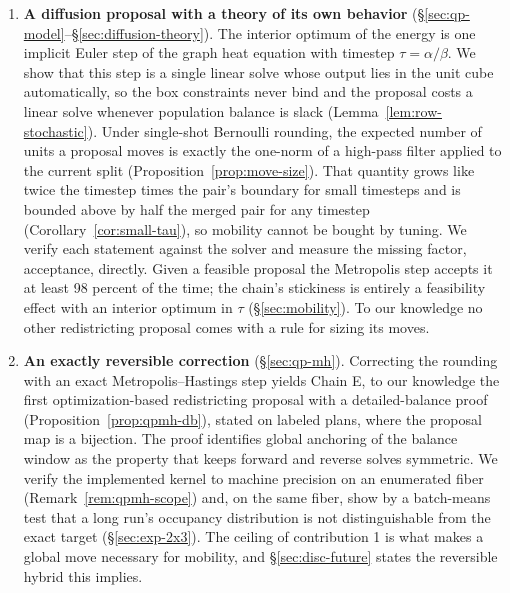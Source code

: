 \documentclass[11pt]{article}
\begin{document}
\begin{enumerate}
  \item \textbf{A diffusion proposal with a theory of its own
    behavior} (\S\ref{sec:qp-model}--\S\ref{sec:diffusion-theory}).
    The interior optimum of the energy is one implicit Euler step of
    the graph heat equation with timestep $\tau = \alpha/\beta$. We
    show that this step is a single linear solve whose output lies in
    the unit cube automatically, so the box constraints never bind
    and the proposal costs a linear solve whenever population balance
    is slack (Lemma~\ref{lem:row-stochastic}). Under single-shot
    Bernoulli rounding, the expected number of units a proposal moves
    is exactly the one-norm of a high-pass filter applied to the
    current split (Proposition~\ref{prop:move-size}). That quantity
    grows like twice the timestep times the pair's boundary for small
    timesteps and is bounded above by half the merged pair for any
    timestep (Corollary~\ref{cor:small-tau}), so mobility cannot be
    bought by tuning. We verify each statement against the solver
    and measure the missing factor, acceptance, directly. Given a
    feasible proposal the Metropolis step accepts it at least 98
    percent of the time; the chain's stickiness is entirely a
    feasibility effect with an interior optimum in $\tau$
    (\S\ref{sec:mobility}). To our knowledge no other redistricting
    proposal comes with a rule for sizing its moves.

  \item \textbf{An exactly reversible correction}
    (\S\ref{sec:qp-mh}). Correcting the rounding with an exact
    Metropolis--Hastings step yields Chain E, to our knowledge the
    first optimization-based redistricting proposal with a
    detailed-balance proof (Proposition~\ref{prop:qpmh-db}), stated
    on labeled plans, where the proposal map is a bijection. The
    proof identifies global anchoring of the balance window as the
    property that keeps forward and reverse solves symmetric. We
    verify the implemented kernel to machine precision on an
    enumerated fiber (Remark~\ref{rem:qpmh-scope}) and, on the same
    fiber, show by a batch-means test that a long run's occupancy
    distribution is not distinguishable from the exact target
    (\S\ref{sec:exp-2x3}). The ceiling of contribution 1 is what
    makes a global move necessary for mobility, and
    \S\ref{sec:disc-future} states the reversible hybrid this
    implies.


\end{enumerate}
\end{document}

